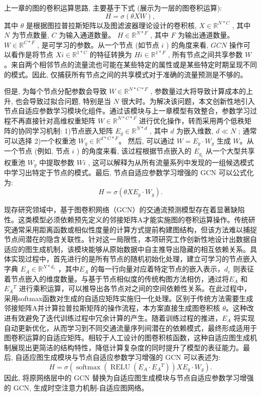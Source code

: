 上一章的图的卷积运算思路, 主要基于下式 (展示为一层的图卷积运算):
\[
H = \sigma \left( {\theta XW}\right), 
\]
其中 \(\theta\) 是根据图拉普拉斯矩阵以及图滤波器理论设计的卷积核, \({X} \in  {\mathbb{R}}^{{N} * {C}}\) , 其中 \({N}\) 为节点数量, \({C}\) 为输入通道数量。 \({H} \in  {\mathbb{R}}^{{N} * {F}}\) , 其中 \({F}\) 为输出通道数量。 \({W} \in  {\mathbb{R}}^{{C} * {F}}\) , 是可学习的参数。从一个节点 (如节点 \({i}\) ) 的角度来看, \({{GCN}}\) 操作可以看作是将节点 \({{Xi}} \in  {\mathbb{R}}^{1 * {C}}\) 的特征转换为 \({{Hi}} \in  {\mathbb{R}}^{1 * {F}}\) , 所有节点之间共享参数 \({W}\)。来自两个相邻节点的流量流也可能在某些特定的属性或是某些特定时期呈现不同的模式。因此, 仅捕获所有节点之间的共享模式对于准确的流量预测是不够的。

但是, 为每个节点分配参数会导致 \({W} \in  {\mathbb{R}}^{{N} * {C} * {F}}\) , 参数量过大将导致计算成本的上升, 也会导致过拟合问题, 特别是当 \({N}\) 很大时。为解决该问题，本文创新性地引入节点自适应参数学习模块化组件。通过该模块与上一章模型有效整合，参数学习过程不再直接针对高维权重矩阵 \({W} \in {\mathbb{R}}^{{N} * {C} * {F}}\) 进行优化操作，转而采用两个低秩矩阵的协同学习机制: 1)节点嵌入矩阵 \({{E}}_{{g}} \in  {\mathbb{R}}^{{N} * {d}}\) , 其中 \({d}\) 为嵌入维数, \({d} \ll  {N}\) ; 通常可以选择 2)一个权重池 \({{W}}_{{g}} \in  {\mathbb{R}}^{{d} * {C} * {F}}\)。 然后, 可以通过 \({W} = {{E}}_{{g}} \cdot  {{W}}_{{g}}\) 生成 \({W}\)。从一个节点 (例如, 节点 \({i}\) ) 的角度来看, 该过程根据节点嵌入的 \({{E}}_{{{g}}_{i}}\) 从一个大型共享权重池 \({{W}}_{{g}}\) 中提取参数 \({{Wi}}\) , 这可以解释为从所有流量系列中发现的一组候选模式中学习出特定于节点的模式。最后, 节点自适应参数学习增强的 GCN 可以公式化为:
\[
H = \sigma \left( {{\theta X}{{E}}_{{g}} \cdot  {{W}}_{{g}}}\right).
\]

现存研究领域中，基于图卷积网络（GCN）的交通流预测模型存在着显著缺陷性。这类模型必须依赖预先定义的邻接矩阵A才能实施图的卷积运算操作。传统研究通常采用距离函数或相似性度量的计算方式提前构建图结构，但该方法难以捕捉节点间潜在的隐含关联性。针对这一局限性，本项研究工作创新性地设计出数据自适应的图生成机制，该模块能够从原始数据中自主推导出隐藏的相互依赖关系。具体实现过程中，首先进行的是所有节点的随机初始化处理，建立可学习的节点嵌入字典 \({{E}}_{{A}} \in  {\mathbb{R}}^{{N} * {{d}}_{{e}}}\) ，其中\({{E}}_{{A}}\) 的每一行向量对应着特定节点的嵌入表示，\({{d}}_{{e}}\) 则表征着节点嵌入的维度数量。与基于节点相似度的传统构图方法相仿，通过将\({{E}}_{{A}}\) 和 \({{E}}_{{A}}{}^{{T}}\) 进行乘积运算，可以推导出各节点对之间的空间依赖性关系。在此过程中，采用softmax函数对生成的自适应矩阵实施归一化处理。区别于传统方法需要生成邻接矩阵A并计算拉普拉斯矩阵的操作流程，本方案直接生成图卷积核 \(\theta\)。这种改进有效避免了迭代训练过程中冗余计算的产生。随着训练过程的推进，\({{E}}_{{A}}\) 将实现自动更新优化，从而学习到不同交通流量序列间潜在的依赖模式，最终形成适用于图卷积运算的自适应矩阵。相较于人工设计的图卷积核函数，这种自适应图生成机制展现出更简洁的结构特性，降低计算复杂度的同时提升了模型的表征能力。最后, 自适应图生成模块与节点自适应参数学习增强的 GCN 可以表述为:
\[
H = \sigma \left( {\operatorname{softmax}\left( {\operatorname{RELU}\left( {{{E}}_{{A}} \cdot  {{E}}_{{A}}{}^{{T}}}\right) }\right) X{{E}}_{{g}} \cdot  {{W}}_{{g}}}\right).
\]
因此, 将原网络层中的 GCN 替换为自适应图生成模块与节点自适应参数学习增强的 GCN, 生成时空注意力机制-自适应图网络。


